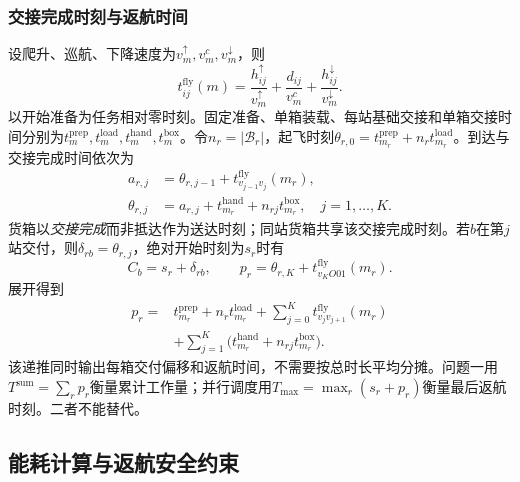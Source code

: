 \subsubsection{交接完成时刻与返航时间}
设爬升、巡航、下降速度为$v_m^\uparrow,v_m^c,v_m^\downarrow$，则
\begin{equation}
 t_{ij}^{\mathrm{fly}}(m)=\frac{h_{ij}^{\uparrow}}{v_m^{\uparrow}}+\frac{d_{ij}}{v_m^c}+\frac{h_{ij}^{\downarrow}}{v_m^{\downarrow}}.
\label{eq:common_leg_time}
\end{equation}
以开始准备为任务相对零时刻。固定准备、单箱装载、每站基础交接和单箱交接时间分别为$t_m^{\mathrm{prep}},t_m^{\mathrm{load}},t_m^{\mathrm{hand}},t_m^{\mathrm{box}}$。令$n_r=|\mathcal B_r|$，起飞时刻$\theta_{r,0}=t_{m_r}^{\mathrm{prep}}+n_rt_{m_r}^{\mathrm{load}}$。到达与交接完成时间依次为
\begin{equation}
\begin{aligned}
 a_{r,j}&=\theta_{r,j-1}+t_{v_{j-1}v_j}^{\mathrm{fly}}(m_r),\\
 \theta_{r,j}&=a_{r,j}+t_{m_r}^{\mathrm{hand}}+n_{rj}t_{m_r}^{\mathrm{box}},\quad j=1,\ldots,K.
\end{aligned}
\label{eq:common_delivery_recursion}
\end{equation}
货箱以\emph{交接完成}而非抵达作为送达时刻；同站货箱共享该交接完成时刻。若$b$在第$j$站交付，则$\delta_{rb}=\theta_{r,j}$，绝对开始时刻为$s_r$时有
\begin{equation}
 C_b=s_r+\delta_{rb},\qquad p_r=\theta_{r,K}+t_{v_KO01}^{\mathrm{fly}}(m_r).
\label{eq:common_delivery_return}
\end{equation}
展开得到
\begin{equation}
\begin{split}
 p_r={}&t_{m_r}^{\mathrm{prep}}+n_rt_{m_r}^{\mathrm{load}}
 +\sum_{j=0}^Kt_{v_jv_{j+1}}^{\mathrm{fly}}(m_r)\\
 &+\sum_{j=1}^K\bigl(t_{m_r}^{\mathrm{hand}}+n_{rj}t_{m_r}^{\mathrm{box}}\bigr).
\end{split}
\label{eq:common_task_duration}
\end{equation}
该递推同时输出每箱交付偏移和返航时间，不需要按总时长平均分摊。问题一用$T^{\mathrm{sum}}=\sum_rp_r$衡量累计工作量；并行调度用$T_{\max}=\max_r(s_r+p_r)$衡量最后返航时刻。二者不能替代。

\subsection{能耗计算与返航安全约束}
